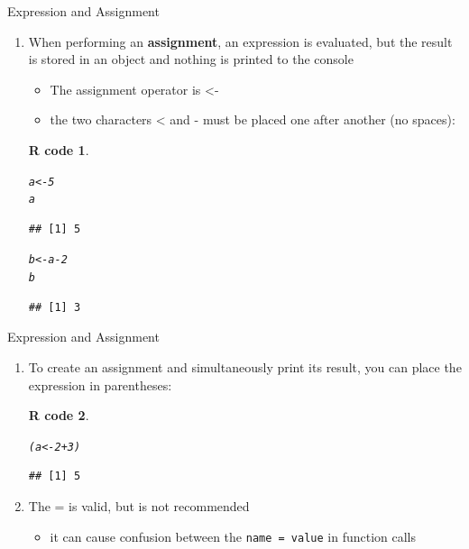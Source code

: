 \documentclass[11pt]{beamer}\usepackage[]{graphicx}\usepackage[]{color}
\makeatletter
\newcommand{\hlnum}[1]{\textcolor[rgb]{0.063,0.58,0.627}{#1}}%
\newcommand{\hlopt}[1]{\textcolor[rgb]{0.196,0.196,0.196}{#1}}%
\newcommand{\hlstd}[1]{\textcolor[rgb]{0.196,0.196,0.196}{#1}}%
\newcommand{\hlkwb}[1]{\textcolor[rgb]{0.627,0,0.314}{#1}}%
\newenvironment{kframe}{%
 \def\at@end@of@kframe{}%
 \ifinner\ifhmode%
  \def\at@end@of@kframe{\end{minipage}}%
  \begin{minipage}{\columnwidth}%
 \fi\fi%
 \def\FrameCommand##1{\hskip\@totalleftmargin \hskip-\fboxsep
 \colorbox{shadecolor}{##1}\hskip-\fboxsep
     \hskip-\linewidth \hskip-\@totalleftmargin \hskip\columnwidth}%
 \MakeFramed {\advance\hsize-\width
   \@totalleftmargin\z@ \linewidth\hsize
   \@setminipage}}%
 {\par\unskip\endMakeFramed%
 \at@end@of@kframe}
\newenvironment{knitrout}{}{} %
\newtheorem{rcode}{R code}[section]
\newcommand{\code}[1]{\texttt{#1}}
\newcounter{saveenumi}
\newcommand{\seti}{\setcounter{saveenumi}{\value{enumi}}}
\newcommand{\conti}{\setcounter{enumi}{\value{saveenumi}}}
\makeatother
\begin{document}
\begin{frame}[fragile]{Expression and Assignment} 
\begin{enumerate}
\conti
\item When performing an \textbf{assignment}, an expression is evaluated, but the result is stored in an object and nothing is printed to the console
\begin{itemize}
\item The assignment operator is <-  
\item the two characters < and - must be placed one after another (no spaces):
\end{itemize}
\pause
\begin{knitrout}
\color{fgcolor}\begin{kframe}
\begin{rcode}\label{unnamed-chunk-23}\begin{alltt}
\hlstd{a} \hlkwb{<-} \hlnum{5}
\hlstd{a}
\end{alltt}
\begin{verbatim}
## [1] 5
\end{verbatim}
\begin{alltt}
\hlstd{b} \hlkwb{<-} \hlstd{a} \hlopt{-} \hlnum{2}
\hlstd{b}
\end{alltt}
\begin{verbatim}
## [1] 3
\end{verbatim}
\end{rcode}\end{kframe}
\end{knitrout}
\seti
\end{enumerate}

\end{frame}

\begin{frame}[fragile]{Expression and Assignment} 
\begin{enumerate}
\conti
\item To create an assignment and simultaneously print its result, you can place the expression in parentheses:
\pause
\begin{knitrout}
\color{fgcolor}\begin{kframe}
\begin{rcode}\label{unnamed-chunk-24}\begin{alltt}
\hlstd{(a} \hlkwb{<-} \hlnum{2} \hlopt{+} \hlnum{3}\hlstd{)}
\end{alltt}
\begin{verbatim}
## [1] 5
\end{verbatim}
\end{rcode}\end{kframe}
\end{knitrout}
\pause \item The = is valid, but is not recommended
\begin{itemize}
\item it can cause confusion between the \code{name = value} in function calls
\end{itemize}

\end{enumerate}
\end{frame}
\end{document}
